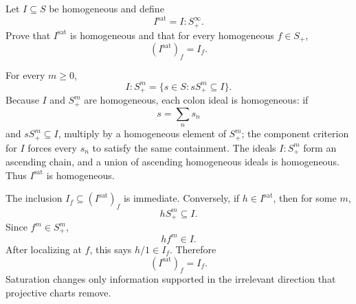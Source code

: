 \begin{problem}\label{prob:vi34-18}
Let \(I\subseteq S\) be homogeneous and define
\[
I^{\mathrm{sat}}=I:S_+^\infty.
\]
Prove that \(I^{\mathrm{sat}}\) is homogeneous and that for every homogeneous \(f\in S_+\),
\[
(I^{\mathrm{sat}})_f=I_f.
\]

\end{problem}

\ifdefined\FullProblemDossiers
\begin{solution}
For every \(m\ge0\),
\[
I:S_+^m
=
\{s\in S:sS_+^m\subseteq I\}.
\]
Because \(I\) and \(S_+^m\) are homogeneous, each colon ideal is homogeneous: if
\[
s=\sum_ns_n
\]
and \(sS_+^m\subseteq I\), multiply by a homogeneous element of \(S_+^m\); the component criterion for \(I\)
forces every \(s_n\) to satisfy the same containment. The ideals \(I:S_+^m\) form an ascending chain, and a union
of ascending homogeneous ideals is homogeneous. Thus \(I^{\mathrm{sat}}\) is homogeneous.

The inclusion \(I_f\subseteq(I^{\mathrm{sat}})_f\) is immediate. Conversely, if \(h\in I^{\mathrm{sat}}\), then for
some \(m\),
\[
hS_+^m\subseteq I.
\]
Since \(f^m\in S_+^m\),
\[
hf^m\in I.
\]
After localizing at \(f\), this says \(h/1\in I_f\). Therefore
\[
\boxed{
(I^{\mathrm{sat}})_f=I_f.
}
\]
Saturation changes only information supported in the irrelevant direction that projective charts remove.
\end{solution}
\fi
